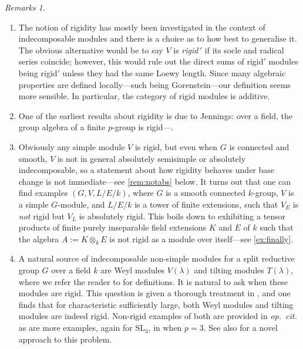 \documentclass[11pt,reqno]{amsart}
\theoremstyle{definition}
\theoremstyle{remark}
\newtheorem*{remarks*}{Remarks}
\theoremstyle{definition}
\theoremstyle{plain}
\newcommand{\SL}{\mathrm{SL}}
\begin{document}
\begin{remarks*}
  \begin{enumerate}\item The notion of rigidity has mostly been investigated in the context of indecomposable modules and there is a choice as to how best to generalise it. The obvious alternative would be to say $V$ is \emph{rigid\,$'$} if its socle and radical series coincide; however, this would rule out the direct sums of rigid$'$ modules being rigid$'$ unless they had the same Loewy length. Since many algebraic properties are defined locally---such being Gorenstein---our definition seems more sensible. In particular, the category of rigid modules is additive.
    
\item One of the earliest results about rigidity is due to Jennings: over a field, the group algebra of a finite $p$-group is rigid---\!\cite[p93]{Ben98}. 

\item Obviously any simple module $V$ is rigid, but even when $G$ is connected and smooth, $V$ is not in general absolutely semisimple or absolutely indecomposable, so a statement about how rigidity behaves under base change is not immediate---see \cref{rem:notabs} below. 
It turns out that one can find examples $(G,V,L/E/k)$, where $G$ is a smooth connected $k$-group, $V$ is a simple $G$-module, and $L/E/k$ is a tower of finite extensions, such that $V_E$ is \emph{not} rigid but $V_L$ is absolutely rigid. 
This boils down to exhibiting a tensor products of finite purely inseparable field extensions $K$ and $E$ of $k$ such that  the algebra $A:=K\otimes_k E$ is not rigid as a module over itself---see \cref{ex:finally}. 

\item A natural source of indecomposable non-simple modules for a split reductive group $G$ over a field $k$ are Weyl modules $V(\lambda)$ and tilting modules $T(\lambda)$, where we refer the reader to \cite[II.2.13,\ II.8.3,\ E.3]{Jan03} for definitions. 
It is natural to ask when these modules are rigid. This question is given a thorough treatment in \cite{And11}, and one finds that for characteristic sufficiently large, both Weyl modules and tilting modules are indeed rigid. Non-rigid examples of both are provided in \emph{op.~cit.} as are more examples, again for $\SL_3$, in \cite{BDM} when $p=3$. See also \cite{Haz17} for a novel approach to this problem.
\end{enumerate}
\end{remarks*}
\end{document}

